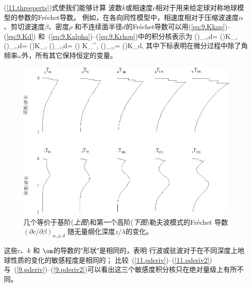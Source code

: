 (\ref{11.threeperts})式使我们能够计算
波数$k$或相速度$c$相对于用来给定球对称地球模型的参数的Fr\'{e}chet导数。
例如，在各向同性模型中，相速度相对于压缩波速度$\alpha$、剪切波速度$\beta$、密度$\rho$
和不连续面半径$d$的Fr\'{e}chet导数可以用(\ref{eq:9.Kkap})--(\ref{eq:9.Kd})
和~(\ref{eq:9.Kalpha})--(\ref{eq:9.Krhop})中的积分核表示为
\eq \label{11.pderiv}
\left(\right)_{\beta,\rho,d}=
\left(\right)K_{\alpha},\qquad
\left(\right)_{\alpha,\rho,d}=
\left(\right)K_{\beta},
\en
\eq \label{11.pderiv2}
\left(\right)_{\alpha,\beta,d}=
\left(\right)
K_{\raisebox{0.3 ex}{\scriptsize$\rho$}}^{\prime},\qquad
\left(\right)_{\alpha,\beta,\rho}=
\left(\right)K_d,
\en
其中下标表明在微分过程中除了角频率$\omega$外，所有其它保持恒定的变量。
\begin{figure}[!t]
\begin{center}
\includegraphics{../figures/chap11/fig23.eps}
\end{center}
\caption[Love kernels]{\label{fig:11.13}
几个等价于基阶({\em 上图\/})和第一个高阶({\em 下图\/})勒夫波模式的Fr\'{e}chet 导数
$(\partial c/\partial\beta)_{\alpha,\rho,d}$
随无量纲化深度$z/\lambda$的变化。
}
\end{figure}
这些$c$、$k$ 和 $\om$的导数的"形状"是相同的，表明
行波或驻波对于在不同深度上地球性质的变化的敏感程度是相同的；
比较~(\ref{11.pderiv})--(\ref{11.pderiv2})与~(\ref{9.pderiv})--(\ref{9.pderiv2})可以看出这三个敏感度积分核只在绝对量级上有所不同。

